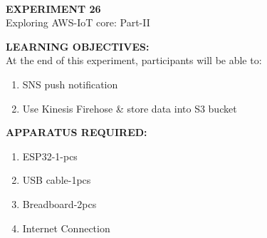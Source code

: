 \documentclass[12pt,a4paper]{article}
\begin{document}
\begin{center}
\textbf{\large \\EXPERIMENT 26 }\\[6pt]
Exploring AWS-IoT core: Part-II
\end{center}

\textbf{\large LEARNING OBJECTIVES:}\\[3pt]
At the end of this experiment, participants will be able to:\vspace{-6mm}\begin{enumerate}
 \setlength\itemsep{-0.3em}
\item SNS push notification
\item Use Kinesis Firehose \& store data into S3 bucket


\end{enumerate}

\textbf{\large APPARATUS REQUIRED:}\\
\vspace{-3mm}
\begin{enumerate}
 \setlength\itemsep{-0.3em}
\item ESP32-1-pcs 
\item USB cable-1pcs
\item Breadboard-2pcs
\item Internet Connection 

\end{enumerate}
\end{document}

